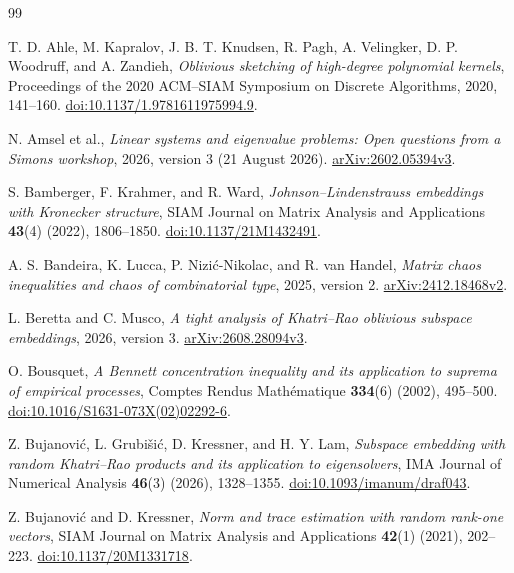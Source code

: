 \documentclass[11pt,a4paper]{article}
\theoremstyle{definition}\newtheorem{definition}[theorem]{Definition}
\theoremstyle{remark}\newtheorem{remark}[theorem]{Remark}
\numberwithin{equation}{section}
\begin{document}
{}
\begin{thebibliography}{99}\small
\setlength{\itemsep}{2pt}\setlength{\parskip}{0pt}

T. D. Ahle, M. Kapralov, J. B. T. Knudsen, R. Pagh, A. Velingker,
D. P. Woodruff, and A. Zandieh,
\emph{Oblivious sketching of high-degree polynomial kernels},
Proceedings of the 2020 ACM--SIAM Symposium on Discrete Algorithms,
2020, 141--160.
\href{https://doi.org/10.1137/1.9781611975994.9}{doi:10.1137/1.9781611975994.9}.

N. Amsel et al.,
\emph{Linear systems and eigenvalue problems: Open questions from a Simons workshop},
2026, version 3 (21 August 2026).
\href{https://arxiv.org/abs/2602.05394v3}{arXiv:2602.05394v3}.

S. Bamberger, F. Krahmer, and R. Ward,
\emph{Johnson--Lindenstrauss embeddings with Kronecker structure},
SIAM Journal on Matrix Analysis and Applications \textbf{43}(4) (2022),
1806--1850.
\href{https://doi.org/10.1137/21M1432491}{doi:10.1137/21M1432491}.

A. S. Bandeira, K. Lucca, P. Nizi\'c-Nikolac, and R. van Handel,
\emph{Matrix chaos inequalities and chaos of combinatorial type},
2025, version 2.
\href{https://arxiv.org/abs/2412.18468v2}{arXiv:2412.18468v2}.

L. Beretta and C. Musco,
\emph{A tight analysis of Khatri--Rao oblivious subspace embeddings},
2026, version 3.
\href{https://arxiv.org/abs/2608.28094v3}{arXiv:2608.28094v3}.

O. Bousquet,
\emph{A Bennett concentration inequality and its application to
suprema of empirical processes},
Comptes Rendus Math\'ematique \textbf{334}(6) (2002), 495--500.
\href{https://doi.org/10.1016/S1631-073X(02)02292-6}
{doi:10.1016/S1631-073X(02)02292-6}.

Z. Bujanovi\'c, L. Grubi\v{s}i\'c, D. Kressner, and H. Y. Lam,
\emph{Subspace embedding with random Khatri--Rao products and its application
to eigensolvers}, IMA Journal of Numerical Analysis \textbf{46}(3) (2026),
1328--1355.
\href{https://doi.org/10.1093/imanum/draf043}{doi:10.1093/imanum/draf043}.

Z. Bujanovi\'c and D. Kressner,
\emph{Norm and trace estimation with random rank-one vectors},
SIAM Journal on Matrix Analysis and Applications \textbf{42}(1) (2021),
202--223.
\href{https://doi.org/10.1137/20M1331718}{doi:10.1137/20M1331718}.


\end{thebibliography}
\end{document}
